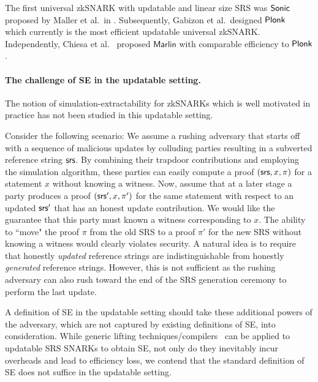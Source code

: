 The first universal zkSNARK with updatable and linear size SRS was
${\textnormal{\textsf{Sonic}}}$ proposed by Maller et al.~in \cite{CCS:MBKM19}. Subsequently, Gabizon et
al.~designed $\textnormal{\textsf{Plonk}}$~\cite{EPRINT:GabWilCio19} which currently is the
most efficient updatable universal zkSNARK. Independently, Chiesa et
al.~\cite{EC:CHMMVW20} proposed $\textsf{Marlin}$ with comparable efficiency to
$\textnormal{\textsf{Plonk}}$.

\paragraph{The challenge of SE in the updatable setting.}

The notion of simulation-extractability for zkSNARKs which is well motivated in practice has not been studied in this updatable setting.

Consider the following scenario: We assume a rushing adversary that starts off with a sequence of malicious updates by colluding parties resulting in a subverted reference string $\mathsf{srs}$. By combining their trapdoor contributions and employing the simulation algorithm, these parties can easily compute a proof $(\mathsf{srs},x,\pi)$ for a statement $x$ without knowing a witness. Now, assume that at a later stage a party produces a proof $(\mathsf{srs}',x,\pi')$ for the same statement with respect to an updated $\mathsf{srs}'$ that has an honest update contribution. We would like the guarantee that this party must known a witness corresponding to $x$. The ability to ``move" the proof $\pi$ from the old SRS to a proof $\pi'$ for the new SRS without knowing a witness would clearly violates security. A natural idea is to require that honestly \emph{updated} reference strings are indistinguishable from honestly \emph{generated} reference strings. However, this is not sufficient as the rushing adversary can also rush toward the end of the SRS generation ceremony to perform the last update.


A definition of SE in the updatable setting should take these additional powers of the adversary, which are not captured by existing definitions of SE, into consideration.
While generic lifting techniques/compilers~\cite{EPRINT:KZMQCP15,CCS:AbdRamSla20} can be applied to updatable SRS SNARKs to obtain SE, not only do they inevitably incur overheads and lead to efficiency loss, we contend that the standard definition of SE does not suffice in the updatable setting.




